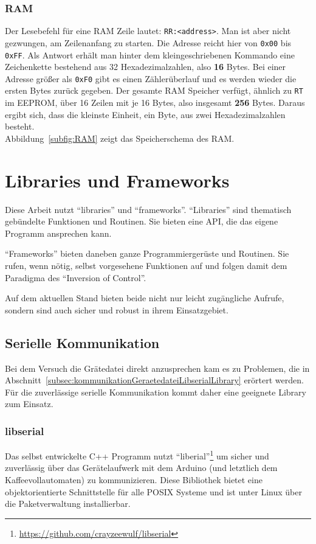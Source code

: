 \subsubsection{RAM}\label{subsubsec:SpeicherDesKaffeevollautomatenRAM}
Der Lesebefehl für eine \ac{RAM} Zeile lautet: \texttt{RR:<address>}.
Man ist aber nicht gezwungen, am Zeilenanfang zu starten.
Die Adresse reicht hier von \texttt{0x00} bis \texttt{0xFF}.
Als Antwort erhält man hinter dem kleingeschriebenen Kommando eine Zeichenkette bestehend aus 32 Hexadezimalzahlen, also \textbf{16} Bytes.
Bei einer Adresse größer als \texttt{0xF0} gibt es einen Zählerüberlauf und es werden wieder die ersten Bytes zurück gegeben.
Der gesamte \ac{RAM} Speicher verfügt, ähnlich zu \texttt{RT} im \ac{EEPROM}, über 16 Zeilen mit je 16 Bytes, also insgesamt \textbf{256} Bytes.
Daraus ergibt sich, dass die kleinste Einheit, ein Byte, aus zwei Hexadezimalzahlen besteht.\\
Abbildung~\ref{subfig:RAM} zeigt das Speicherschema des \ac{RAM}.



\section{Libraries und Frameworks}
Diese Arbeit nutzt "`libraries"' und "`frameworks"'.
"`Libraries"' sind thematisch gebündelte Funktionen und Routinen. Sie bieten eine \ac{API}, die das eigene Programm ansprechen kann.

"`Frameworks"' bieten daneben ganze Programmiergerüste und Routinen. Sie rufen, wenn nötig, selbst vorgesehene Funktionen auf und folgen damit dem Paradigma des "`Inversion of Control"'.

Auf dem aktuellen Stand bieten beide nicht nur leicht zugängliche Aufrufe, sondern sind auch sicher und robust in ihrem Einsatzgebiet.

\subsection{Serielle Kommunikation}
Bei dem Versuch die Grätedatei direkt anzusprechen kam es zu Problemen, die in Abschnitt~\ref{subsec:kommunikationGeraetedateiLibserialLibrary} erörtert werden. Für die zuverlässige serielle Kommunikation kommt daher eine geeignete Library zum Einsatz.

\subsubsection{libserial}
Das selbst entwickelte C++ Programm nutzt "`liberial"'\footnote{\url{https://github.com/crayzeewulf/libserial}} um sicher und zuverlässig über das Gerätelaufwerk mit dem Arduino (und letztlich dem Kaffeevollautomaten) zu kommunizieren.
Diese Bibliothek bietet eine objektorientierte Schnittstelle für alle \ac{POSIX} Systeme und ist unter Linux über die Paketverwaltung installierbar.

